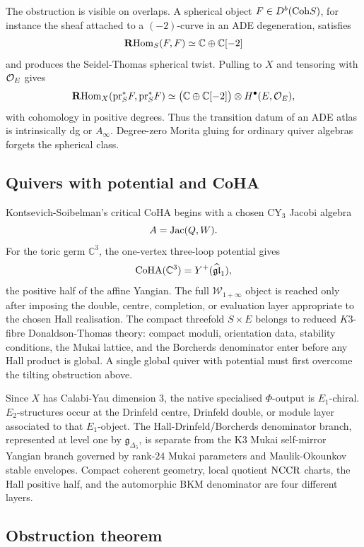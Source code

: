 The obstruction is visible on overlaps.  A spherical object
\(F\in D^b(\mathrm{Coh} S)\), for instance the sheaf attached to a \((-2)\)-curve
in an ADE degeneration, satisfies
\[
  \mathbf{R}\!\operatorname{Hom}_S(F,F)\simeq \mathbb C\oplus \mathbb C[-2]
\]
and produces the Seidel-Thomas spherical twist.  Pulling to \(X\)
and tensoring with \(\mathcal{O}_E\) gives
\[
  \mathbf{R}\!\operatorname{Hom}_X(\mathrm{pr}_S^*F,\mathrm{pr}_S^*F)
  \simeq
  \bigl(\mathbb C\oplus\mathbb C[-2]\bigr)
  \otimes
  H^\bullet(E,\mathcal{O}_E),
\]
with cohomology in positive degrees.  Thus the transition datum of an
ADE atlas is intrinsically dg or \(A_\infty\).  Degree-zero Morita
gluing for ordinary quiver algebras forgets the spherical class.

\subsection*{Quivers with potential and CoHA}

Kontsevich-Soibelman's critical CoHA begins with a chosen CY$_3$
Jacobi algebra
\[
  A=\operatorname{Jac}(Q,W).
\]
For the toric germ \(\mathbb C^3\), the one-vertex three-loop
potential gives
\[
  \operatorname{CoHA}(\mathbb C^3)=Y^+(\widehat{\mathfrak{gl}}_1),
\]
the positive half of the affine Yangian.  The full
\(\mathcal W_{1+\infty}\) object is reached only after imposing the
double, centre, completion, or evaluation layer appropriate to the
chosen Hall realisation.  The compact threefold
\(S\times E\) belongs to reduced \(K3\)-fibre Donaldson-Thomas theory:
compact moduli, orientation data, stability conditions, the Mukai
lattice, and the Borcherds denominator enter before any Hall product is
global.  A single global quiver with potential must first overcome the
tilting obstruction above.

Since \(X\) has Calabi-Yau dimension \(3\), the native specialised
\(\Phi\)-output is \(E_1\)-chiral.  \(E_2\)-structures occur at the
Drinfeld centre, Drinfeld double, or module layer associated to that
\(E_1\)-object.  The Hall-Drinfeld/Borcherds denominator branch,
represented at level one by \(\mathfrak g_{\Delta_5}\), is separate
from the K3 Mukai self-mirror Yangian branch governed by rank-\(24\)
Mukai parameters and Maulik-Okounkov stable envelopes.  Compact
coherent geometry, local quotient \(\mathrm{NCCR}\) charts, the Hall positive
half, and the automorphic BKM denominator are four different layers.

\subsection*{Obstruction theorem}

